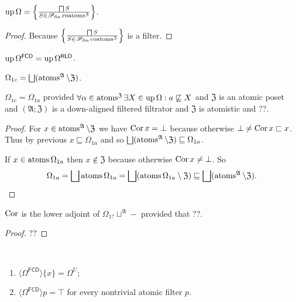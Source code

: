 \begin{prop}
  $\operatorname{up} \Omega = \left\{ \frac{ \bigsqcap S }{ S \in
  \mathscr{P}_{\operatorname{fin}} \operatorname{coatoms}^{\mathfrak{Z}} }\right\}$.
\end{prop}

\begin{proof}
  Because $\left\{ \frac{ \bigsqcap S }{ S \in
  \mathscr{P}_{\operatorname{fin}} \operatorname{coatoms}^{\mathfrak{Z}} }\right\}$ is a
  filter.
\end{proof}

\begin{cor}
  $\operatorname{up} \Omega^{\mathsf{FCD}} = \operatorname{up}
  \Omega^{\mathsf{RLD}}$.
\end{cor}

\begin{defn}
$\Omega_{1c} =
\bigsqcup(\atoms^{\mathfrak{A}}\setminus\mathfrak{Z})$.
\end{defn}

\begin{prop}
$\Omega_{1c} = \Omega_{1a}$ provided
  $\forall \alpha \in \operatorname{atoms}^{\mathfrak{Z}} \exists X \in \operatorname{up}
  \Omega : a \not\sqsubseteq X$ and $\mathfrak{Z}$ is an atomic
  poset and $(\mathfrak{A}; \mathfrak{Z})$ is a down-aligned
  filtered filtrator and $\mathfrak{Z}$ is atomistic and ??.
\end{prop}

\begin{proof}
For $x\in\operatorname{atoms}^{\mathfrak{A}}\setminus\mathfrak{Z}$ we have
$\operatorname{Cor} x=\bot$ because otherwise $\bot\ne\operatorname{Cor} x\sqsubset x$.
Thus by previous $x\sqsubseteq\Omega_{1a}$ and so
$\bigsqcup(\atoms^{\mathfrak{A}}\setminus\mathfrak{Z})\sqsubseteq\Omega_{1a}$.

If $x\in\operatorname{atoms}\Omega_{1a}$ then $x\notin\mathfrak{Z}$ because otherwise
$\operatorname{Cor} x\ne\bot$. So \[ \Omega_{1a}=\bigsqcup\atoms \Omega_{1a}=
\bigsqcup(\atoms \Omega_{1a}\setminus\mathfrak{Z})\sqsubseteq
\bigsqcup(\atoms^{\mathfrak{A}}\setminus\mathfrak{Z}). \]
\end{proof}

\begin{thm}
$\operatorname{Cor}$ is the lower adjoint of $\Omega_{1?}\sqcup^{\mathfrak{A}}-$
provided that ??. 
\end{thm}

\begin{proof}
??
\end{proof}

\begin{prop}
  ~  
  \begin{enumerate}
    \item $\langle \Omega^{\mathsf{FCD}} \rangle \{ x \} = \Omega^U$;
    
    \item $\langle \Omega^{\mathsf{FCD}} \rangle p = \top$ for every
    nontrivial atomic filter $p$.
  \end{enumerate}
\end{prop}

